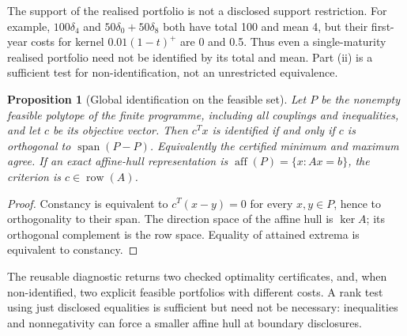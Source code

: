 \documentclass[11pt,a4paper]{article}
\newtheorem{proposition}{Proposition}
\theoremstyle{remark}
\begin{document}
The support of the realised portfolio is not a disclosed support restriction. For example, $100\delta_4$ and $50\delta_0+50\delta_8$ both have total 100 and mean 4, but their first-year costs for kernel $0.01(1-t)^+$ are 0 and 0.5. Thus even a single-maturity realised portfolio need not be identified by its total and mean. Part (ii) is a sufficient test for non-identification, not an unrestricted equivalence.

\begin{proposition}[Global identification on the feasible set]\label{prop:global}
Let $P$ be the nonempty feasible polytope of the finite programme, including all couplings and inequalities, and let $c$ be its objective vector. Then $c^Tx$ is identified if and only if $c$ is orthogonal to $\operatorname{span}(P-P)$. Equivalently the certified minimum and maximum agree. If an exact affine-hull representation is $\operatorname{aff}(P)=\{x:Ax=b\}$, the criterion is $c\in\operatorname{row}(A)$.
\end{proposition}
\begin{proof}
Constancy is equivalent to $c^T(x-y)=0$ for every $x,y\in P$, hence to orthogonality to their span. The direction space of the affine hull is $\ker A$; its orthogonal complement is the row space. Equality of attained extrema is equivalent to constancy.
\end{proof}
The reusable diagnostic returns two checked optimality certificates, and, when non-identified, two explicit feasible portfolios with different costs. A rank test using just disclosed equalities is sufficient but need not be necessary: inequalities and nonnegativity can force a smaller affine hull at boundary disclosures.
\end{document}
